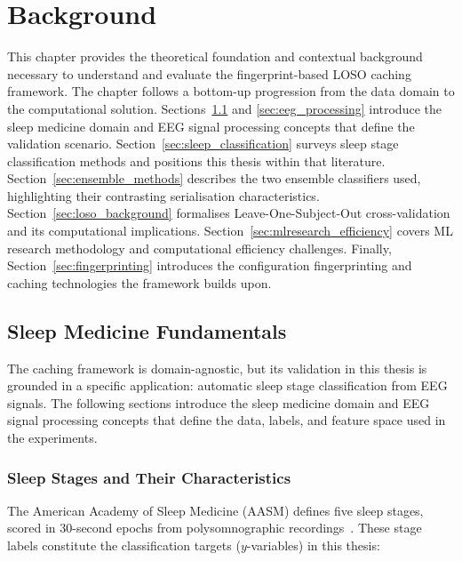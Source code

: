 \chapter{Background}

This chapter provides the theoretical foundation and contextual background necessary to understand and evaluate the fingerprint-based LOSO caching framework. The chapter follows a bottom-up progression from the data domain to the computational solution. Sections~\ref{sec:sleep_medicine} and \ref{sec:eeg_processing} introduce the sleep medicine domain and EEG signal processing concepts that define the validation scenario. Section~\ref{sec:sleep_classification} surveys sleep stage classification methods and positions this thesis within that literature. Section~\ref{sec:ensemble_methods} describes the two ensemble classifiers used, highlighting their contrasting serialisation characteristics. Section~\ref{sec:loso_background} formalises Leave-One-Subject-Out cross-validation and its computational implications. Section~\ref{sec:mlresearch_efficiency} covers ML research methodology and computational efficiency challenges. Finally, Section~\ref{sec:fingerprinting} introduces the configuration fingerprinting and caching technologies the framework builds upon.

\section{Sleep Medicine Fundamentals}
\label{sec:sleep_medicine}

The caching framework is domain-agnostic, but its validation in this thesis
is grounded in a specific application: automatic sleep stage classification
from EEG signals. The following sections introduce the sleep medicine domain
and EEG signal processing concepts that define the data, labels, and
feature space used in the experiments.

\subsection{Sleep Stages and Their Characteristics}

The American Academy of Sleep Medicine (AASM) defines five sleep stages,
scored in 30-second epochs from polysomnographic recordings~\cite{berry2020aasm}.
These stage labels constitute the classification targets ($y$-variables) in this
thesis:

